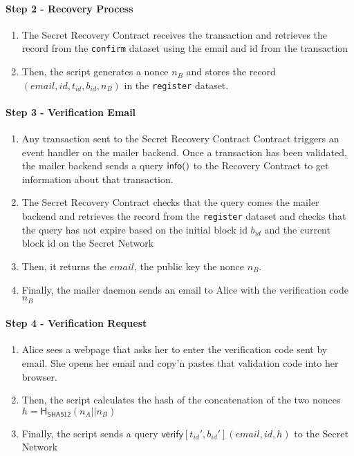 \documentclass[12pt]{article}
\newcommand{\ms}[1]{\ensuremath{\mathsf{#1}}}
\newcommand{\tx}[3]{\ms{#1}[#2](#3)}
\newcommand{\qry}[3]{\ms{#1}(#3)}
\begin{document}
\paragraph{Step 2 - Recovery Process}

\begin{enumerate}[label=2.\arabic*]
    \item The Secret Recovery Contract receives the transaction and retrieves the record from the {\tt confirm} dataset using the email and id from the transaction
    \item Then, the script generates a nonce $n_B$ and stores the record $(email, id, t_{id}, b_{id}, n_B)$ in the {\tt register} dataset.
\end{enumerate}

\paragraph{Step 3 - Verification Email}

\begin{enumerate}[label=3.\arabic*]
  \item Any transaction sent to the Secret Recovery Contract Contract triggers an event handler on the mailer backend. Once a transaction has been validated, the mailer backend sends a query $\qry{info}{t_id}$ to the Recovery Contract to get information about that transaction.
  \item The Secret Recovery Contract checks that the query comes the mailer backend and retrieves the record from the {\tt register} dataset and checks that the query has not expire based on the initial block id $b_{id}$ and the current block id on the Secret Network
  \item Then, it returns the $email$, the public key the nonce $n_B$.
  \item Finally, the mailer daemon sends an email to Alice with the verification code $n_B$
\end{enumerate}

\paragraph{{\bf Step 4} - Verification Request}

\begin{enumerate}[label=4.\arabic*]
  \item Alice sees a webpage that asks her to enter the verification code sent by email. She opens her email and copy'n pastes that validation code into her browser.
  \item Then, the script calculates the hash of the concatenation of the two nonces $h=\ms{H_{\ms{SHA512}}}(n_A || n_B)$
  \item Finally, the script sends a query $\tx{verify}{t_{id}', b_{id}'}{email, id, h}$ to the Secret Network
\end{enumerate}
\end{document}
